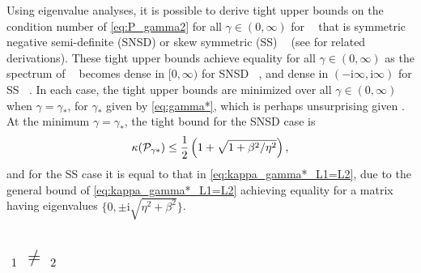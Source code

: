 \documentclass[review]{siamart}
\newcommand{\tcb}{\textcolor{blue}}
\DeclareMathOperator{\cL}{\widehat{\mathcal{L}}}
\begin{document}
%
\begin{remark}
Using eigenvalue analyses, it is possible to derive tight upper bounds on the
condition number of \eqref{eq:P_gamma2} for all $\gamma \in (0, \infty)$ for
$\cL$ that is symmetric negative semi-definite (SNSD) or skew symmetric (SS)
$\cL$ (see \cite{exh} for related derivations).
These tight upper bounds achieve equality for all $\gamma \in (0,
\infty)$ as the spectrum of $\cL$ becomes dense in $[0, \infty)$ for SNSD
$\cL$, and dense in $(- \mathrm{i} \infty, \mathrm{i} \infty)$ for SS $\cL$. In each
case, the tight upper bounds are minimized over all $\gamma \in (0, \infty)$
when $\gamma = \gamma_*$, for $\gamma_*$ given by \eqref{eq:gamma*}, which is
perhaps unsurprising given . At the minimum $\gamma =
\gamma_*$, the tight bound for the SNSD case is
\begin{align*}
\kappa({\cal P}_{\gamma*}) \leq \frac{1}{2} \left( 1 + \sqrt{1 + \beta^2/\eta^2} \right),
\end{align*}
and for the SS case it is equal to that in \eqref{eq:kappa_gamma*_L1=L2}, due
to the general bound  of \eqref{eq:kappa_gamma*_L1=L2} achieving equality for a
matrix $\cL$ having eigenvalues $\{0, \pm \mathrm{i} \sqrt{\eta^2 + \beta^2} \}$.
\end{remark}


\subsection{$\cL_1 \neq \cL_2$}\label{sec:theory:gen}
\end{document}
